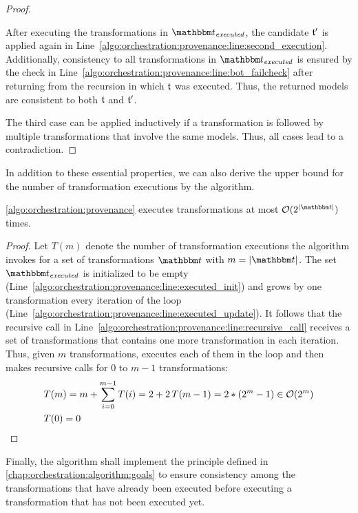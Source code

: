 \begin{proof}
\begin{longenumerate}
        After executing the transformations in $\provalgexecuted$, the candidate $\transformation{t}'$ is applied again in Line~\ref{algo:orchestration:provenance:line:second_execution}. 
        Additionally, consistency to all transformations in $\provalgexecuted$ is ensured by the check in Line~\ref{algo:orchestration:provenance:line:bot_failcheck} after returning from the recursion in which $\transformation{t}$ was executed.
        Thus, the returned models are consistent to both $\transformation{t}$ and $\transformation{t}'$.
    \end{longenumerate}
    The third case can be applied inductively if a transformation is followed by multiple transformations that involve the same models. Thus, all cases lead to a contradiction.
\end{proof}

In addition to these essential properties, we can also derive the upper bound for the number of transformation executions by the algorithm.

\begin{theorem}
    \autoref{algo:orchestration:provenance} executes transformations at most $\mathcal{O}(2^{\abs{\transformationset{T}}})$ times.
\end{theorem}
\begin{proof}
	Let $T(m)$ denote the number of transformation executions the algorithm invokes for a set of transformations $\transformationset{T}$ with $m = \abs{\transformationset{T}}$.
	The set $\provalgexecuted$ is initialized to be empty (Line~\ref{algo:orchestration:provenance:line:executed_init}) and grows by one transformation every iteration of the loop (Line~\ref{algo:orchestration:provenance:line:executed_update}).
    It follows that the recursive call in Line~\ref{algo:orchestration:provenance:line:recursive_call} receives a set of transformations that contains one more transformation in each iteration.
    Thus, given $m$ transformations,  executes each of them in the loop and then makes recursive calls for $0$ to $m-1$ transformations:
    \begin{align*}
        &
    T(m)	=m+\sum_{i=0}^{m-1}T(i)
    	=2+2\,T(m-1)
        =2*(2^{m}-1) \in \mathcal{O}(2^m) \\
        &
    T(0)	=0 \qedhere
	\end{align*}
\end{proof}

Finally, the algorithm shall implement the principle defined in \autoref{chap:orchestration:algorithm:goals} to ensure consistency among the transformations that have already been executed before executing a transformation that has not been executed yet.

